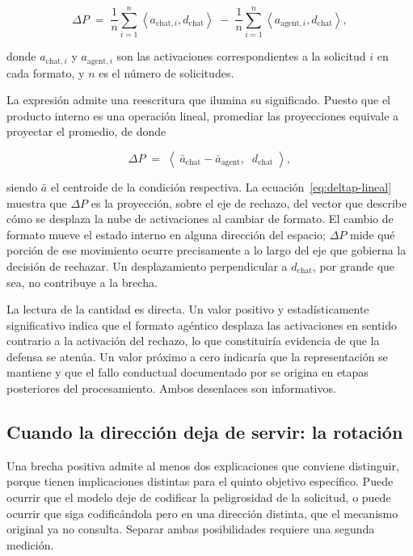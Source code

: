 \begin{equation}
  \Delta P
  \;=\;
  \frac{1}{n}\sum_{i=1}^{n}\left\langle a_{\text{chat},i}, d_{\text{chat}}\right\rangle
  \;-\;
  \frac{1}{n}\sum_{i=1}^{n}\left\langle a_{\text{agent},i}, d_{\text{chat}}\right\rangle,
  \label{eq:deltap}
\end{equation}

\noindent
donde $a_{\text{chat},i}$ y $a_{\text{agent},i}$ son las activaciones
correspondientes a la solicitud $i$ en cada formato, y $n$ es el número de
solicitudes.

La expresión admite una reescritura que ilumina su significado. Puesto que el
producto interno es una operación lineal, promediar las proyecciones equivale a
proyectar el promedio, de donde

\begin{equation}
  \Delta P
  \;=\;
  \left\langle\; \bar{a}_{\text{chat}} - \bar{a}_{\text{agent}},\;\; d_{\text{chat}} \;\right\rangle,
  \label{eq:deltap-lineal}
\end{equation}

\noindent
siendo $\bar{a}$ el centroide de la condición respectiva. La
ecuación~\eqref{eq:deltap-lineal} muestra que $\Delta P$ es la proyección, sobre
el eje de rechazo, del vector que describe cómo se desplaza la nube de
activaciones al cambiar de formato. El cambio de formato mueve el estado
interno en alguna dirección del espacio; $\Delta P$ mide qué porción de ese
movimiento ocurre precisamente a lo largo del eje que gobierna la decisión de
rechazar. Un desplazamiento perpendicular a $d_{\text{chat}}$, por grande que
sea, no contribuye a la brecha.

La lectura de la cantidad es directa. Un valor positivo y estadísticamente
significativo indica que el formato agéntico desplaza las activaciones en
sentido contrario a la activación del rechazo, lo que constituiría evidencia de
que la defensa se atenúa. Un valor próximo a cero indicaría que la
representación se mantiene y que el fallo conductual documentado por
\textcite{andriushchenko2024} se origina en etapas posteriores del
procesamiento. Ambos desenlaces son informativos.

\subsection{Cuando la dirección deja de servir: la rotación}
\label{subsec:rotacion}

Una brecha positiva admite al menos dos explicaciones que conviene distinguir,
porque tienen implicaciones distintas para el quinto objetivo específico. Puede
ocurrir que el modelo deje de codificar la peligrosidad de la solicitud, o
puede ocurrir que siga codificándola pero en una dirección distinta, que el
mecanismo original ya no consulta. Separar ambas posibilidades requiere una
segunda medición.

